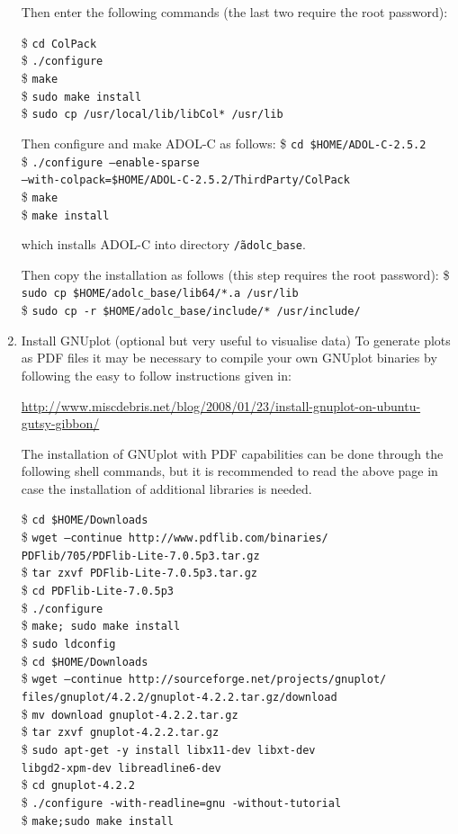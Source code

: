 \documentclass[a4paper,11pt]{report}    %
\newcommand{\shell}[1]{\$ \texttt{#1}\\}
\newcommand{\shellcont}[1]{\texttt{#1}\\}
\newenvironment{shadedframe}{%
  \def\FrameCommand{\fcolorbox{black}{shadecolor}}%
  \MakeFramed {\FrameRestore}}
{\endMakeFramed}
\begin{document}
\begin{enumerate}
Then enter the following commands (the last two require the root password):

\begin{shadedframe}
\shell{cd ColPack}
\shell{./configure}
\shell{make}
\shell{sudo make install}
\shell{sudo cp /usr/local/lib/libCol* /usr/lib}
\end{shadedframe}

Then configure and make ADOL-C as follows:
\begin{shadedframe}
\shell{cd \$HOME/ADOL-C-2.5.2}
\shell{./configure --enable-sparse }
\shellcont{--with-colpack=\$HOME/ADOL-C-2.5.2/ThirdParty/ColPack}
\shell{make}
\shell{make install}

\end{shadedframe}

which installs ADOL-C into directory \texttt{\~ /adolc$\_$base}.

Then copy the installation as follows (this step requires the root password):
\begin{shadedframe}
\shell{sudo cp \$HOME/adolc\_base/lib64/*.a /usr/lib}
\shell{sudo cp -r \$HOME/adolc\_base/include/* /usr/include/}
\end{shadedframe}


\item Install GNUplot (optional  but very useful to visualise data)
To generate plots as PDF files it may be necessary to compile your own GNUplot binaries by following
the easy to follow  instructions given in:

\href{http://www.miscdebris.net/blog/2008/01/23/install-gnuplot-on-ubuntu-gutsy-gibbon/}{http://www.miscdebris.net/blog/2008/01/23/install-gnuplot-on-ubuntu-gutsy-gibbon/}

The installation of GNUplot with PDF capabilities can be done through the following shell commands, but it is recommended to read the above page in case the installation of additional libraries is needed.

\begin{shadedframe}
\shell{cd \$HOME/Downloads}
\shell{wget --continue http://www.pdflib.com/binaries/}
\shellcont{PDFlib/705/PDFlib-Lite-7.0.5p3.tar.gz}
\shell{tar zxvf PDFlib-Lite-7.0.5p3.tar.gz}
\shell{cd PDFlib-Lite-7.0.5p3 }
\shell{./configure}
\shell{make; sudo make install}
\shell{sudo ldconfig}
\shell{cd \$HOME/Downloads}
\shell{wget --continue http://sourceforge.net/projects/gnuplot/}
\shellcont{files/gnuplot/4.2.2/gnuplot-4.2.2.tar.gz/download}
\shell{mv download gnuplot-4.2.2.tar.gz}
\shell{tar zxvf gnuplot-4.2.2.tar.gz}
\shell{sudo apt-get -y install libx11-dev libxt-dev}
\shellcont{libgd2-xpm-dev libreadline6-dev}
\shell{cd gnuplot-4.2.2}
\shell{./configure -with-readline=gnu -without-tutorial}
\shell{make;sudo make install}
\end{shadedframe}


\end{enumerate}
\end{document}
